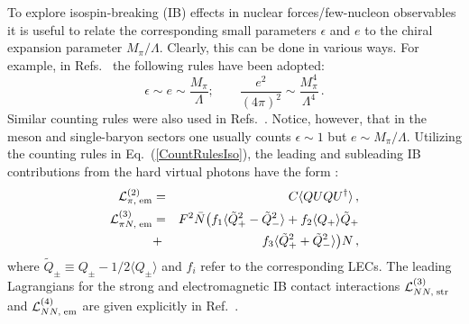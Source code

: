 \documentclass[aps,rmp,nofootinbib,twocolumn,floatfix]{revtex4}
\newcommand{\beq}{\begin{equation}}
\newcommand{\eeq}{\end{equation}}
\newcommand{\beqa}{\begin{eqnarray}}
\newcommand{\eeqa}{\end{eqnarray}}
\newcommand{\nn}{\nonumber \\ }
\begin{document}
To explore isospin-breaking (IB) effects in nuclear forces/few-nucleon
observables it is useful to relate the corresponding small parameters
$\epsilon$ and $e$ to the chiral expansion parameter $M_\pi /
\Lambda$.  Clearly, 
this can be done in various ways. For example, in
Refs.~\cite{Walzl:2000cx,Epelbaum:2004xf,Epelbaum:2005fd} the following rules
have been adopted:
 \beq\label{CountRulesIso}
\epsilon \sim e \sim \frac{M_\pi}{\Lambda}; \quad \quad
\frac{e^2}{(4 \pi )^2}  \sim \frac{M_\pi^4}{\Lambda^4}\,.
\eeq
Similar counting rules were also used in
Refs.~\cite{VanKolck:1993ee,vanKolck:1996rm,Friar:1999zr,Friar:2003yv,Friar:2004ca,Friar:2004rg}. Notice,
however, that in the meson and single-baryon sectors one usually counts
$\epsilon \sim 1$ but  $e \sim M_\pi/\Lambda$.
Utilizing the counting rules in Eq.~(\ref{CountRulesIso}),
the leading and subleading IB contributions from the hard virtual photons have
the form \cite{Muller:1999ww}:  
\beqa
\label{lagr_em}
\mathcal{L}_{\pi, \; \rm em}^{(2)} &=& C \langle Q U Q U^\dagger \rangle \,, \nn
\mathcal{L}_{\pi N , \; \rm em}^{(3)} &=& F^2 \bar{N} \big( f_1  \langle \tilde
Q_+^2 - \tilde Q_-^2 \rangle  +  f_2  \langle 
Q_+ \rangle \tilde  Q_+  \nn
&+&   f_3  \langle \tilde
Q_+^2 + \tilde Q_-^2 \rangle \big) N \,,
\eeqa
where $\tilde Q_\pm \equiv  Q_\pm - 1/2 \langle  Q_\pm \rangle$ and 
$f_i$ refer to the corresponding LECs. The leading Lagrangians for the 
strong and electromagnetic IB contact interactions $\mathcal{L}_{NN, \; \rm
  str}^{(3)}$ and $\mathcal{L}_{NN, \; \rm
  em}^{(4)}$ are given explicitly in Ref.~\cite{Walzl:2000cx}. 
\end{document}
